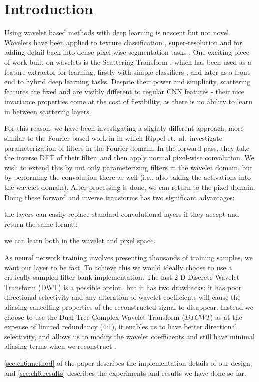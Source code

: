 \section{Introduction}\label{sec:ch6:intro}
Using wavelet based methods with deep learning is nascent but not novel.
Wavelets have been applied to texture classification \cite{fujieda_wavelet_2017,
sifre_combined_2012}, super-resolution \cite{guo_deep_2017} and for adding
detail back into dense pixel-wise segmentation tasks \cite{ma_detailed_2018}.
One exciting piece of work built on wavelets is the Scattering Transform
\cite{mallat_group_2012}, which has been used as a feature extractor for
learning, firstly with simple classifiers \cite{bruna_invariant_2013,
singh_scatternet_2017}, and later as a front end to hybrid deep learning
tasks\cite{oyallon_scaling_2017, singh_scatternet_2018}. Despite their power and
simplicity, scattering features are fixed and are visibly different to regular
CNN features \cite{cotter_visualizing_2017} - their nice invariance properties
come at the cost of flexibility, as there is no ability to learn in between
scattering layers. 

For this reason, we have been investigating a slightly different approach, more
similar to the Fourier based work in \cite{rippel_spectral_2015} in which Rippel
et.\ al.\ investigate parameterization of filters in the Fourier domain. In the
forward pass, they take the inverse DFT of their filter, and then apply normal
pixel-wise convolution. We wish to extend this by not only parameterizing
filters in the wavelet domain, but by performing the convolution there as well
(i.e., also taking the activations into the wavelet domain). After processing is
done, we can return to the pixel domain. Doing these forward and inverse
transforms has two significant advantages: 
\begin{enumerate*}[label=\roman*)]
  \item the layers can easily replace standard convolutional layers if they
    accept and return the same format;
  \item we can learn both in the wavelet and pixel space.
\end{enumerate*}

As neural network training involves presenting thousands of training samples, we
want our layer to be fast. To achieve this we would ideally choose to use
a critically sampled filter bank implementation. The fast 2-D Discrete Wavelet
Transform (DWT) is a possible option, but it has two drawbacks: it has poor
directional selectivity and any alteration of wavelet coefficients will cause
the aliasing cancelling properties of the reconstructed signal to disappear.
Instead we choose to use the Dual-Tree Complex Wavelet Transform ($DTCWT$)
\cite{selesnick_dual-tree_2005} as at the expense of limited redundancy (4:1),
it enables us to have better directional selectivity, and allows us to modify
the wavelet coefficients and still have minimal aliasing terms when we
reconstruct \cite{kingsbury_complex_2001}.

\autoref{sec:ch6:method} of the paper describes the implementation details of
our design, and \autoref{sec:ch6:results} describes the experiments and results
we have done so far.

